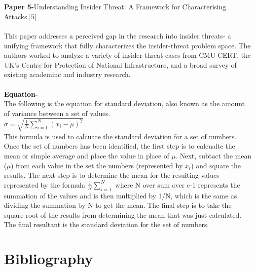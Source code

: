 \documentclass[12pt]{article}
\begin{document}
\\
\\
\textbf {Paper 5-}Understanding Insider Threat: A Framework for Characterising Attacks.[5]
\\
\\
This paper addresses a perceived gap in the research into insider threats- a unifying framework that fully characterizes the insider-threat problem space. The authors worked to analyze a variety of insider-threat cases from CMU-CERT, the UK's Centre for Protection of National Infrastructure, and a broad survey of existing academinc and industry research. 
\\
\\
\textbf{Equation-} 
\\
The following is the equation for standard deviation, also known as the amount of variance between a set of values.  
\\
$\sigma =\sqrt{ \frac{1}{N}{\displaystyle\sum_{i=1}^{N} (x_i-\mu)^2}  }   $
\\
This formula is used to calcuate the standard deviation for a set of numbers.  Once the set of numbers has been identified, the first step is to calcualte the mean or simple average and place the value in place of $ \mu$.  Next, subtact the mean ($\mu$) from each value in the set the numbers (represented by $x_i$) and square the results. The next step is to determine the mean for the resulting values represented by the formula ${ \frac{1}{N}{\displaystyle\sum_{i=1}^{N}}}$ where N over sum over e-1 represents the summation of the values and is then multiplied by 1/N, which is the same as dividing the summation by N to get the mean. The final step is to take the square root of  the results from determining the mean that was just calculated.  The final resultant is the standard deviation for the set of numbers. 
\\
\section*{Bibliography}
\end{document}
